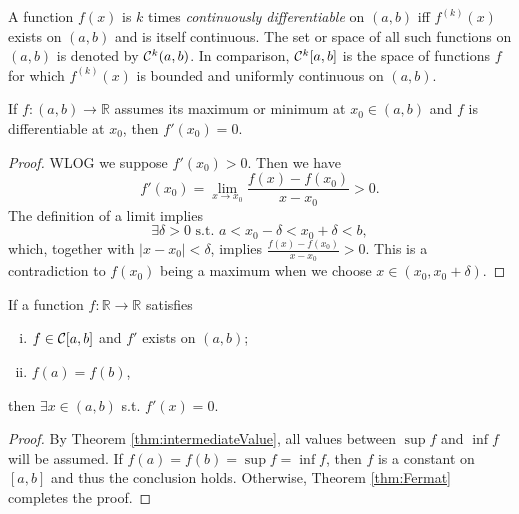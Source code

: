 \begin{defn}
  A function $f(x)$ is
   $k$ times \emph{continuously differentiable}
   on $(a,b)$
   iff $f^{(k)}(x)$ exists on $(a,b)$ and is itself continuous.
  The set or space of all such functions on $(a,b)$
   is denoted by ${\cal C}^k(a,b)$.
  In comparison,
   ${\cal C}^k[a,b]$ is the space of functions $f$
   for which $f^{(k)}(x)$ is bounded and uniformly continuous on $(a,b)$.
\end{defn}

\begin{thm}[Fermat]
  \label{thm:Fermat}
  If $f:(a,b)\rightarrow\mathbb{R}$
   assumes its maximum or minimum at $x_0\in(a,b)$
   and $f$ is differentiable at $x_0$,
   then $f'(x_0)=0$.
\end{thm}
\begin{proof}
  WLOG we suppose $f'(x_0)>0$. Then we have
  \begin{displaymath}
    f'(x_0)=\lim_{x\rightarrow x_0} \frac{f(x)-f(x_0)}{x-x_0}>0.
  \end{displaymath}
  The definition of a limit implies
  \begin{displaymath}
   \exists \delta>0 \text{ s.t. } 
   a<x_0-\delta<x_0+\delta<b,
  \end{displaymath}
   which, together with $|x-x_0|<\delta$, 
   implies
   $\frac{f(x)-f(x_0)}{x-x_0}>0$.
  This is a contradiction to $f(x_0)$ being a maximum
  when we choose $x\in(x_0,x_0+\delta)$.
\end{proof}

\begin{thm}[Rolle's]
  \label{thm:Rolles}
  If a function $f:\mathbb{R}\rightarrow\mathbb{R}$
   satisfies
   \begin{enumerate}[(i)]\itemsep0em
   \item $f\in {\cal C}[a,b]$ and $f'$ exists on $(a,b)$;
   \item $f(a)=f(b)$,
   \end{enumerate}
  then $\exists x\in (a,b)$ s.t. $f'(x)=0$.
\end{thm}
\begin{proof}
  By Theorem \ref{thm:intermediateValue},
   all values between $\sup f$ and $\inf f$
   will be assumed.
  If $f(a)=f(b)=\sup f=\inf f$,
   then $f$ is a constant on $[a,b]$
   and thus the conclusion holds.
  Otherwise, Theorem \ref{thm:Fermat} completes the proof.
\end{proof}

